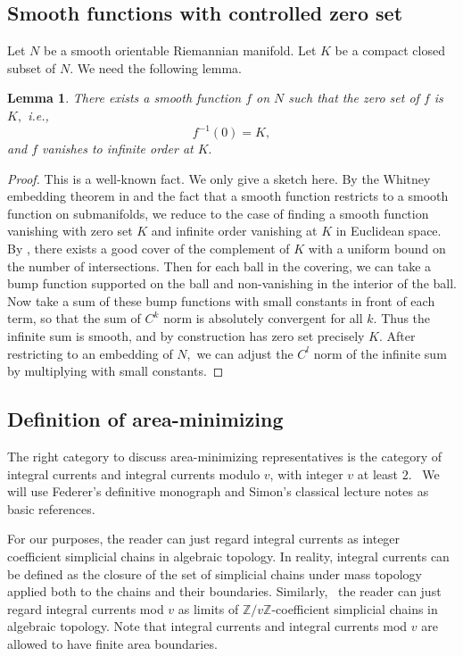 \documentclass[11pt,a4paper]{amsart}
\numberwithin{equation}{section}
\newcommand{\m}{^{-1}}
\newcommand{\Z}{\mathbb{Z}}
\theoremstyle{plain}
\newtheorem{lem}[exam]{Lemma}
\theoremstyle{definition}
\numberwithin{equation}{subsection}
\begin{document}
	\subsection{Smooth functions with controlled zero set}
	Let $N$ be a smooth orientable Riemannian manifold. Let $K$ be a compact closed subset of $N.$ We need the following lemma.
	\begin{lem}\label{lemzs}
		There exists a smooth function $f$ on $N$ such that the zero set of $f$ is $K, $ i.e., $$f\m(0)=K,$$ and $f$ vanishes to infinite order at $K.$
	\end{lem}
	\begin{proof}This is a well-known fact. We only give a sketch here.
		By the Whitney embedding theorem in \cite{CW} and the fact that a smooth function restricts to a smooth function on submanifolds, we reduce to the case of finding a smooth function vanishing with zero set $K$ and infinite order vanishing at $K$ in Euclidean space. By \cite[3.1.13]{HF}, there exists a good cover of the complement of $K$ with a uniform bound on the number of intersections. Then for each ball in the covering, we can take a bump function supported on the ball and non-vanishing in the interior of the ball. Now take a sum of these bump functions with small constants in front of each term, so that the sum of $C^k$ norm is absolutely convergent for all $k$. Thus the infinite sum is smooth, and by construction has zero set precisely $K$. After restricting to an embedding of $N, $ we can adjust the $C^l$ norm of the infinite sum by multiplying with small constants.
	\end{proof} 
	\subsection{Definition of area-minimizing}
	The right category to discuss area-minimizing representatives is the category of integral currents and integral currents modulo $v$, with integer $v$ at least $2$.  We will use Federer's definitive monograph \cite{HF} and Simon's classical lecture notes \cite{LS} as basic references. 
	
	For our purposes, the reader can just regard integral currents as integer coefficient simplicial chains in algebraic topology. In reality, integral currents can be defined \cite[4.1.24]{HF} as the closure of the set of simplicial chains under mass topology applied both to the chains and their boundaries. Similarly,  the reader can just regard integral currents mod $v$ as limits of $\Z/v\Z$-coefficient simplicial chains in algebraic topology. Note that integral currents and integral currents mod $v$ are allowed to have finite area boundaries.
	
\end{document}

